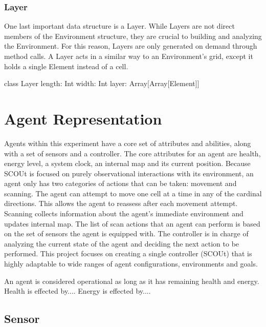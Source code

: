 \subsubsection{Layer}
One last important data structure is a Layer.
While Layers are not direct members of the Environment structure, they are crucial to building and analyzing the Environment.
For this reason, Layers are only generated on demand through method calls.
A Layer acts in a similar way to an Environment’s grid, except it holds a single Element instead of a cell.

class Layer {
	length: Int
	width: Int
	layer: Array[Array[Element]]
}



\section{Agent Representation}
Agents within this experiment have a core set of attributes and abilities, along with a set of sensors and a controller.
The core attributes for an agent are health, energy level, a system clock, an internal map and its current position.
Because SCOUt is focused on purely observational interactions with its environment, an agent only has two categories of actions that can be taken: movement and scanning.
The agent can attempt to move one cell at a time in any of the cardinal directions.
This allows the agent to reassess after each movement attempt.
Scanning collects information about the agent's immediate environment and updates internal map.
The list of scan actions that an agent can perform is based on the set of sensors the agent is equipped with.
The controller is in charge of analyzing the current state of the agent and deciding the next action to be performed.
This project focuses on creating a single controller (SCOUt) that is highly adaptable to wide ranges of agent configurations, environments and goals.

An agent is considered operational as long as it has remaining health and energy.
Health is effected by....
Energy is effected by....


\subsection{Sensor}


